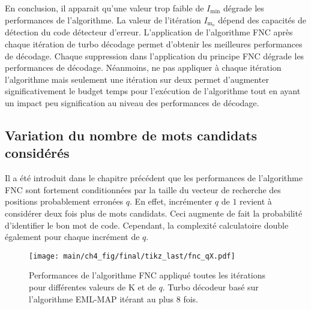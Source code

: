 En conclusion, il apparait qu'une valeur trop faible de $I_\text{min}$ dégrade les performances de l'algorithme. 
La valeur de l'itération $I_{\text{m}_\text{o}}$ dépend des
capacités de détection du code détecteur d'erreur. L'application de l'algorithme FNC après chaque itération de turbo 
décodage permet d'obtenir les meilleures performances de décodage. Chaque suppression dans l'application du principe FNC 
dégrade les performances de décodage. Néanmoins, ne pas appliquer à chaque itération l'algorithme mais seulement une 
itération sur deux permet d'augmenter significativement le budget temps pour l'exécution de l'algorithme tout en ayant 
un impact peu signification au niveau des performances de décodage. 

\subsection{Variation du nombre de mots candidats considérés}
Il a été introduit dans le chapitre précédent que les performances de l'algorithme FNC sont fortement conditionnées
par la taille du vecteur de recherche des positions probablement erronées $q$. En effet, incrémenter $q$ de $1$ revient 
à considérer deux fois plus de mots candidats. Ceci augmente de fait la probabilité d'identifier le bon mot de code. 
Cependant, la complexité calculatoire double également pour chaque incrément de $q$. 

\begin{figure}[!t]
	\hspace*{-.075\textwidth}
	\texttt{[image: main/ch4\_fig/final/tikz\_last/fnc\_qX.pdf]}
	\caption{Performances de l'algorithme FNC appliqué toutes les itérations pour différentes 
	valeurs de K et de $q$.
	Turbo décodeur basé sur l'algorithme EML-MAP itérant au plus 8 fois.
	\label{fig:fnc_q}}
\end{figure}

